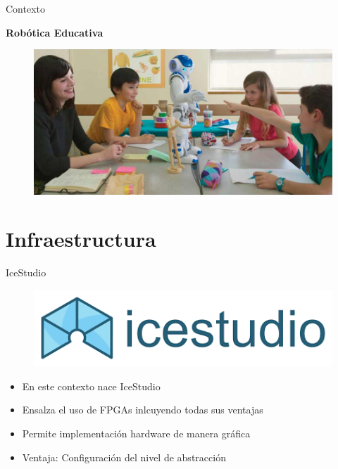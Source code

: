 \documentclass{beamer}
\begin{document}
\begin{frame}{Contexto}
\begin{block}{}
	\centering	\textbf{Robótica Educativa}
\end{block}
		\begin{figure}[H]
	\center
	\includegraphics[trim = 0cm 0mm 0mm 0cm,clip, angle=0, scale = 0.3]{imagenes/Introduction/robotica}
\end{figure}
\end{frame}

\section{Infraestructura}
\begin{frame}{IceStudio}
		\begin{figure}[H]
	\center
	\includegraphics[trim = 0cm 0mm 0mm 0cm,clip, angle=0, scale = 0.3]{imagenes/Introduction/IceStudio}
\end{figure}
	\begin{block}{}
		\begin{itemize}
			\item En este contexto nace IceStudio \pause
			\item Ensalza el uso de FPGAs inlcuyendo todas sus ventajas \pause
			\item Permite implementación hardware de manera gráfica \pause
			\item Ventaja: Configuración del nivel de abstracción 
		\end{itemize}
	\end{block}
\end{frame}
\end{document}

